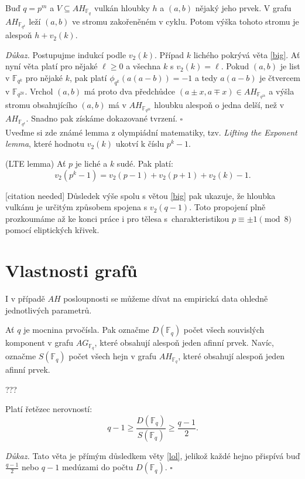 \documentclass[12pt]{report}
\begin{document}
\begin{dusledek}\label{hloub}
Buď $q = p^m$ a $V \subseteq AH_{\mathbb{F}_q}$ vulkán hloubky $h$ a $(a,b)$ nějaký jeho prvek. V grafu $AH_{\mathbb{F}_{q^k}}$ leží $(a,b)$ ve stromu zakořeněném v cyklu. Potom výška tohoto stromu je alespoň $h+v_2(k)$.
\end{dusledek}
\noindent \textit{Důkaz.} Postupujme indukcí podle $v_2(k)$. Případ $k$ lichého pokrývá věta \ref{big}. Ať nyní věta platí pro nějaké $\ell \geqslant 0$ a všechna $k$ s $v_2 (k) = \ell$. Pokud $(a,b)$ je list v $\mathbb{F}_{q^k}$ pro nějaké $k$, pak platí $\phi_{q^k} (a(a-b)) = -1$ a tedy $a(a-b)$ je čtvercem v $\mathbb{F}_{q^{2k}}$. Vrchol $(a,b)$ má proto dva předchůdce $(a\pm x,a\mp x) \in AH_{\mathbb{F}_{q^{2k}}}$  a výšla stromu obsahujícího $(a,b)$ má v $AH_{\mathbb{F}_{q^{2k}}}$ hloubku alespoň o jedna delší, než v $AH_{\mathbb{F}_{q^{k}}}$. Snadno pak získáme dokazované tvrzení. \hfill $\square$\\

Uveďme si zde známé lemma z olympiádní matematiky, tzv. \textit{Lifting the Exponent lemma}, které hodnotu $v_2(k)$ ukotví k číslu $p^k - 1$. 
\begin{veta}(LTE lemma)
Ať $p$ je liché a $k$ sudé. Pak platí:
$$v_2 (p^k - 1) = v_2(p-1)+v_2 (p+1) + v_2 (k) - 1.$$
\end{veta}
[citation needed] Důsledek výše spolu s větou \ref{big} pak ukazuje, že hloubka vulkánu je určitým způsobem spojena s $v_2 (q-1)$. Toto propojení plně prozkoumáme až ke konci práce i pro tělesa s~charakteristikou $p \equiv \pm 1 \pmod{8}$ pomocí eliptických křivek.

\section{Vlastnosti grafů}

I v případě $AH$ posloupnosti se můžeme dívat na empirická data ohledně jednotlivých parametrů.

\begin{definice}
Ať $q$ je mocnina prvočísla. Pak označme $D(\mathbb{F}_q)$ počet všech souvislých komponent v grafu $AG_{\mathbb{F}_q}$, které obsahují alespoň jeden afinní prvek. Navíc, označme $S(\mathbb{F}_q)$ počet všech hejn v grafu $AH_{\mathbb{F}_q}$, které obsahují alespoň jeden afinní prvek.
\end{definice}
???
\begin{veta}
Platí řetězec nerovností:
$$q-1 \geqslant \frac{D(\mathbb{F}_q)}{S(\mathbb{F}_q)} \geqslant \frac{q-1}{2}.$$
\end{veta}
\noindent \textit{Důkaz.} Tato věta je přímým důsledkem věty \ref{lol}, jelikož každé hejno přispívá buď $\frac{q-1}{2}$ nebo $q-1$ medúzami do počtu $D(\mathbb{F}_q)$. \hfill $\square$\\
\end{document}
